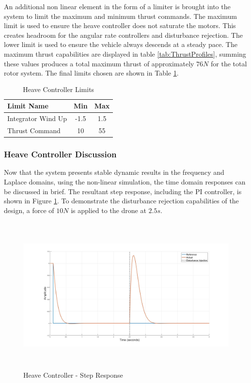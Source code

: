 \documentclass[12pt]{report}
\begin{document}
	An additional non linear element in the form of a limiter is brought into the system to limit the maximum and minimum thrust commands. The maximum limit is used to ensure the heave controller does not saturate the motors. This creates headroom for the angular rate controllers and disturbance rejection. The lower limit is used to ensure the vehicle always descends at a steady pace. The maximum thrust capabilities are displayed in table \ref{tab:ThrustProfiles}, summing these values produces a total maximum thrust of approximately $76N$ for the total rotor system. The final limits chosen are shown in Table \ref{tab:HeaveLimits}.
	
	\begin{table}[!]
		\centering
		\begin{tabular}{l | c | c |}
			Limit Name 				& Min & Max\\
			\hline\hline
			Integrator Wind Up 	   	& -1.5 	& 1.5 \\
			Thrust Command 		    & 10	& 55 \\
		\end{tabular}
		\caption{Heave Controller Limits}
		\label{tab:HeaveLimits}
	\end{table}
	
	
	
	\subsubsection{Heave Controller Discussion}
	Now that the system presents stable dynamic results in the frequency and Laplace domains, using the non-linear simulation, the time domain responses can be discussed in brief. The resultant step response, including the PI controller, is shown in Figure \ref{IM_HeaveStepDist}. To demonstrate the disturbance rejection capabilities of the design, a force of $10N$ is applied to the drone at $2.5s$.
	
	\begin{figure}[H]
		\centering
		\includegraphics[height = 8cm]{../Design/Matlab/Controllers/heave_step.jpg}
		\caption{Heave Controller -  Step Response}
		\label{IM_HeaveStepDist}
	\end{figure}
	
\end{document}

